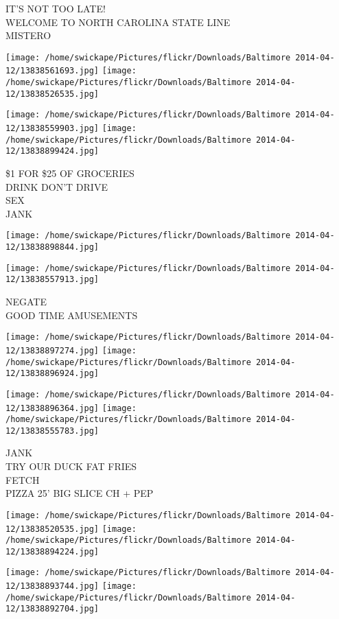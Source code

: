 \documentclass[10pt,letterpaper]{article}
\begin{document}
IT'S NOT TOO LATE!\\
WELCOME TO NORTH CAROLINA STATE LINE\\
MISTERO
\pagebreak

\texttt{[image: /home/swickape/Pictures/flickr/Downloads/Baltimore 2014-04-12/13838561693.jpg]}
\texttt{[image: /home/swickape/Pictures/flickr/Downloads/Baltimore 2014-04-12/13838526535.jpg]}

\texttt{[image: /home/swickape/Pictures/flickr/Downloads/Baltimore 2014-04-12/13838559903.jpg]}
\texttt{[image: /home/swickape/Pictures/flickr/Downloads/Baltimore 2014-04-12/13838899424.jpg]}

\$1 FOR \$25 OF GROCERIES\\
DRINK DON'T DRIVE\\
SEX\\
JANK
\pagebreak

\texttt{[image: /home/swickape/Pictures/flickr/Downloads/Baltimore 2014-04-12/13838898844.jpg]}

\vspace{0.25in}
\texttt{[image: /home/swickape/Pictures/flickr/Downloads/Baltimore 2014-04-12/13838557913.jpg]}

NEGATE\\
GOOD TIME AMUSEMENTS
\pagebreak

\texttt{[image: /home/swickape/Pictures/flickr/Downloads/Baltimore 2014-04-12/13838897274.jpg]}
\texttt{[image: /home/swickape/Pictures/flickr/Downloads/Baltimore 2014-04-12/13838896924.jpg]}

\texttt{[image: /home/swickape/Pictures/flickr/Downloads/Baltimore 2014-04-12/13838896364.jpg]}
\texttt{[image: /home/swickape/Pictures/flickr/Downloads/Baltimore 2014-04-12/13838555783.jpg]}

JANK\\
TRY OUR DUCK FAT FRIES\\
FETCH\\
PIZZA 25' BIG SLICE CH + PEP
\pagebreak

\texttt{[image: /home/swickape/Pictures/flickr/Downloads/Baltimore 2014-04-12/13838520535.jpg]}
\texttt{[image: /home/swickape/Pictures/flickr/Downloads/Baltimore 2014-04-12/13838894224.jpg]}

\texttt{[image: /home/swickape/Pictures/flickr/Downloads/Baltimore 2014-04-12/13838893744.jpg]}
\texttt{[image: /home/swickape/Pictures/flickr/Downloads/Baltimore 2014-04-12/13838892704.jpg]}
\end{document}
